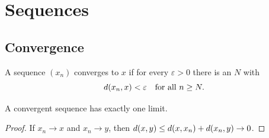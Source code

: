 \chapter{Sequences}

\section{Convergence}

\begin{definition}
A sequence $(x_n)$ converges to $x$ if for every $\varepsilon > 0$ there is an $N$ with
\[ d(x_n, x) < \varepsilon \quad \text{for all } n \ge N. \]
\end{definition}

\begin{theorem}
A convergent sequence has exactly one limit.
\end{theorem}

\begin{proof}
If $x_n \to x$ and $x_n \to y$, then $d(x, y) \le d(x, x_n) + d(x_n, y) \to 0$.
\end{proof}
